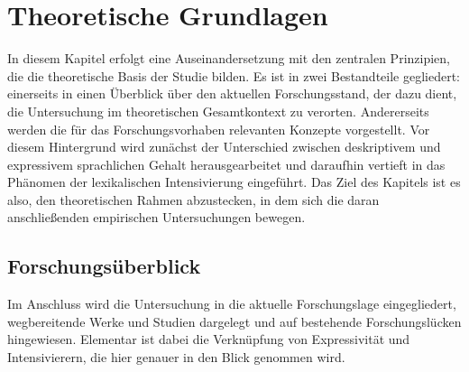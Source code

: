 \chapter{{Theoretische Grundlagen}} \label{Theorie}

In diesem Kapitel erfolgt eine Auseinandersetzung mit den zentralen Prinzipien, die die theoretische Basis der Studie bilden. Es ist in zwei Bestandteile gegliedert: einerseits in einen Überblick über den aktuellen Forschungsstand, der dazu dient, die Untersuchung im theoretischen Gesamtkontext zu verorten. Andererseits werden die für das Forschungsvorhaben relevanten Konzepte vorgestellt. Vor diesem Hintergrund wird zunächst der Unterschied zwischen deskriptivem und expressivem sprachlichen Gehalt herausgearbeitet und daraufhin vertieft in das Phänomen der lexikalischen Intensivierung eingeführt. Das Ziel des Kapitels ist es also, den theoretischen Rahmen abzustecken, in dem sich die daran anschließenden empirischen {Untersuchungen bewegen}.

\section{Forschungsüberblick} \label{Forschungsüberblick}
Im Anschluss wird die Untersuchung in die aktuelle Forschungslage eingegliedert, wegbereitende Werke und Studien dargelegt und auf bestehende Forschungslücken hingewiesen. Elementar ist dabei die Verknüpfung von Expressivität und Intensivierern, die hier genauer in den Blick {genommen wird.}

